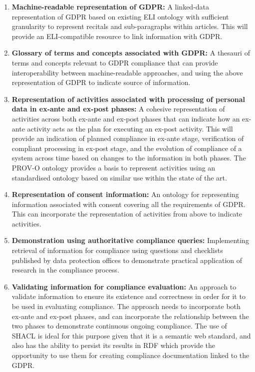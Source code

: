 \begin{enumerate}
\item \textbf{Machine-readable representation of GDPR:} A linked-data representation of GDPR based on existing ELI ontology with sufficient granularity to represent recitals and sub-paragraphs within articles. This will provide an ELI-compatible resource to link information with GDPR.
\item \textbf{Glossary of terms and concepts associated with GDPR:} A thesauri of terms and concepts relevant to GDPR compliance that can provide interoperability between machine-readable approaches, and using the above representation of GDPR to indicate source of information.
\item \textbf{Representation of activities associated with processing of personal data in ex-ante and ex-post phases:} A cohesive representation of activities across both ex-ante and ex-post phases that can indicate how an ex-ante activity acts as the plan for executing an ex-post activity. This will provide an indication of planned compliance in ex-ante stage, verification of compliant processing in ex-post stage, and the evolution of compliance of a system across time based on changes to the information in both phases. The PROV-O ontology provides a basis to represent activities using an standardised ontology based on similar use within the state of the art.
\item \textbf{Representation of consent information:} An ontology for representing information associated with consent covering all the requirements of GDPR. This can incorporate the representation of activities from above to indicate activities.
\item \textbf{Demonstration using authoritative compliance queries:} Implementing retrieval of information for compliance using questions and checklists published by data protection offices to demonstrate practical application of research in the compliance process.
\item \textbf{Validating information for compliance evaluation:} An approach to validate information to ensure its existence and correctness in order for it to be used in evaluating compliance. The approach needs to incorporate both ex-ante and ex-post phases, and can incorporate the relationship between the two phases to demonstrate continuous ongoing compliance. The use of SHACL is ideal for this purpose given that it is a semantic web standard, and also has the ability to persist its results in RDF which provide the opportunity to use them for creating compliance documentation linked to the GDPR.
\end{enumerate}